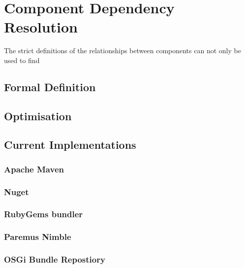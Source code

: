 \chapter{Component Dependency Resolution}
{}The strict definitions of the relationships between components can not only be used to find  

\section{Formal Definition}


\section{Optimisation}

\section{Current Implementations}

\subsection{Apache Maven}

\subsection{Nuget} 

\subsection{RubyGems bundler}


\subsection{Paremus Nimble}

\subsection{OSGi Bundle Repostiory}

